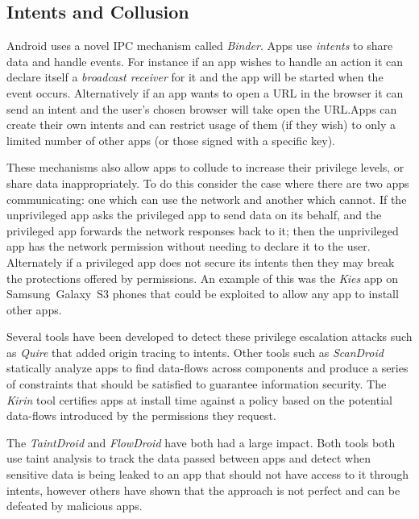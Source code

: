 \documentclass[report.tex]{subfiles}
\begin{document}
\subsection{Intents and Collusion}

Android uses a novel IPC mechanism called \emph{Binder}.  Apps use
\emph{intents} to share data and handle events.  For instance if an app wishes
to handle an  action it can declare itself a \emph{broadcast
  receiver} for it and the app will be started when the event occurs.
Alternatively if an app wants to open a URL in the browser it can send an
 intent and the user's chosen browser will take open the
URL.\@ Apps can create their own intents and can restrict usage of them (if they
wish) to only a limited number of other apps (or those signed with a specific
key).

These mechanisms also allow apps to collude to increase their privilege levels,
or share data inappropriately.  To do this consider the case where there are two
apps communicating: one which can use the network and another which cannot.  If
the unprivileged app asks the privileged app to send data on its behalf, and the
privileged app forwards the network responses back to it; then the unprivileged
app has the network permission without needing to declare it to the user.
Alternately if a privileged app does not secure its intents then they may break
the protections offered by permissions.  An example of this was the \emph{Kies}
app on Samsung~Galaxy~S3 phones that could be exploited to allow any app to
install other apps\cite{moulu:8btkPowj}.

Several tools have been developed to detect these privilege escalation attacks
such as \emph{Quire}\cite{Bugiel:2012ui} that added origin tracing to intents.
Other tools such as \emph{ScanDroid}\cite{Fuchs:2009vi} statically analyze apps
to find data-flows across components and produce a series of constraints that
should be satisfied to guarantee information security.  The
\emph{Kirin}\cite{Enck:2009ko} tool certifies apps at install time against a
policy based on the potential data-flows introduced by the permissions they
request.

The \emph{TaintDroid}\cite{Enck:2010uw} and \emph{FlowDroid}\cite{Fritz:2013vi}
have both had a large impact.  Both tools both use taint analysis to track the
data passed between apps and detect when sensitive data is being leaked to an
app that should not have access to it through intents, however others have shown
that the approach is not perfect\cite{Sarwar:2013ta} and can be defeated by
malicious apps.
\end{document}
